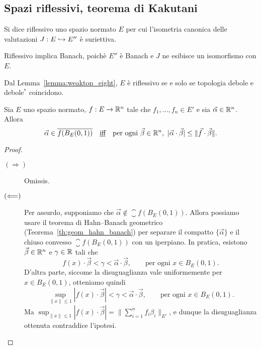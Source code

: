 \subsection{Spazi riflessivi, teorema di Kakutani}
\begin{definition}
	Si dice riflessivo uno spazio normato $E$ per cui l'isometria canonica delle valutazioni $J : E \hookrightarrow E''$ è suriettiva.
\end{definition}

\begin{remark}
	Riflessivo implica Banach, poichè $E''$ è Banach e $J$ ne esibisce un isomorfismo con $E$.
\end{remark}
\begin{remark}
	Dal Lemma~\ref{lemma:weaktop_eight}, $E$ è riflessivo se e solo se topologia debole e debole$^*$ coincidono.
\end{remark}

\begin{lemma}[Helly]
	Sia $E$ uno spazio normato, $f : E \to \mathbb{R}^n$ tale che $f_1, \ldots, f_n \in E'$ e sia $\vec \alpha \in \mathbb{R}^n$.
	Allora
	\begin{equation*}
		\vec \alpha \in \overline{f(B_E(0,1))} \quad\text{\underline{iff}}\quad \text{per ogni $\vec \beta \in \mathbb{R}^n$},\ |\vec\alpha \cdot \vec\beta| \leq \|\vec f \cdot \vec \beta\|.
	\end{equation*}
\end{lemma}
\begin{proof}
	\leavevmode
	\begin{description}
		\item[$(\Longrightarrow)$] Omissis.
		\item[$(\Longleftarrow)$] Per assurdo, supponiamo che $\vec \alpha \notin \closure{f(B_E(0,1))}$. Allora possiamo usare il teorema di Hahn--Banach geometrico (Teorema~\ref{th:geom_hahn_banach}) per separare il compatto $\{\vec\alpha\}$ e il chiuso convesso $\closure{f(B_E(0,1))}$ con un iperpiano. In pratica, esistono $\vec\beta \in \mathbb{R}^n$ e $\gamma \in \mathbb{R}$ tali che
		\begin{equation*}
			f(x) \cdot \vec \beta < \gamma < \vec \alpha \cdot \vec \beta, \qquad \text{per ogni $x \in B_E(0,1)$}.
		\end{equation*}
		D'altra parte, siccome la disuguaglianza vale uniformemente per $x \in B_E(0,1)$, otteniamo quindi
		\begin{equation*}
			\sup_{\|x\| \leq 1} |f(x) \cdot \vec \beta| < \gamma < \vec \alpha \cdot \vec \beta, \qquad \text{per ogni $x \in B_E(0,1)$}.
		\end{equation*}
		Ma $\sup_{\|x\| \leq 1} |f(x) \cdot \vec \beta| = \|\sum_{i=1}^n f_i \beta_i\|_{E'}$, e dunque la disuguaglianza ottenuta contraddice l'ipotesi.
	\end{description}
\end{proof}

